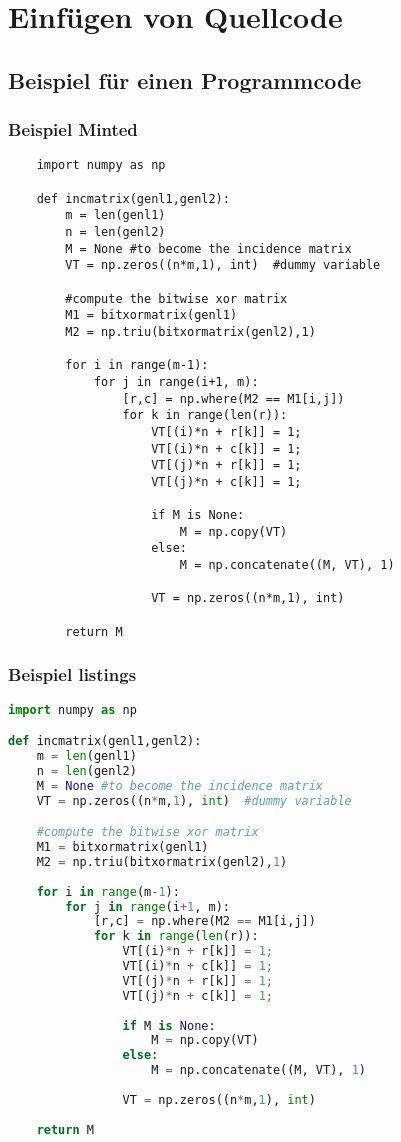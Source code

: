 \chapter{Einfügen von Quellcode}
\label{chap:code}

\section{Beispiel für einen Programmcode}


\mintedinstall
\subsection{Beispiel Minted}
	\begin{verbatim}
	import numpy as np
	
	def incmatrix(genl1,genl2):
		m = len(genl1)
		n = len(genl2)
		M = None #to become the incidence matrix
		VT = np.zeros((n*m,1), int)  #dummy variable
	
		#compute the bitwise xor matrix
		M1 = bitxormatrix(genl1)
		M2 = np.triu(bitxormatrix(genl2),1) 
	
		for i in range(m-1):
			for j in range(i+1, m):
				[r,c] = np.where(M2 == M1[i,j])
				for k in range(len(r)):
					VT[(i)*n + r[k]] = 1;
					VT[(i)*n + c[k]] = 1;
					VT[(j)*n + r[k]] = 1;
					VT[(j)*n + c[k]] = 1;
					
					if M is None:
						M = np.copy(VT)
					else:
						M = np.concatenate((M, VT), 1)
					
					VT = np.zeros((n*m,1), int)
	
		return M
	\end{verbatim}
\fi




\subsection{Beispiel listings}
\begin{lstlisting}[language=Python]
import numpy as np

def incmatrix(genl1,genl2):
	m = len(genl1)
	n = len(genl2)
	M = None #to become the incidence matrix
	VT = np.zeros((n*m,1), int)  #dummy variable

	#compute the bitwise xor matrix
	M1 = bitxormatrix(genl1)
	M2 = np.triu(bitxormatrix(genl2),1) 
	
	for i in range(m-1):
		for j in range(i+1, m):
			[r,c] = np.where(M2 == M1[i,j])
			for k in range(len(r)):
				VT[(i)*n + r[k]] = 1;
				VT[(i)*n + c[k]] = 1;
				VT[(j)*n + r[k]] = 1;
				VT[(j)*n + c[k]] = 1;
	
				if M is None:
					M = np.copy(VT)
				else:
					M = np.concatenate((M, VT), 1)
				
				VT = np.zeros((n*m,1), int)
				
	return M
\end{lstlisting}

